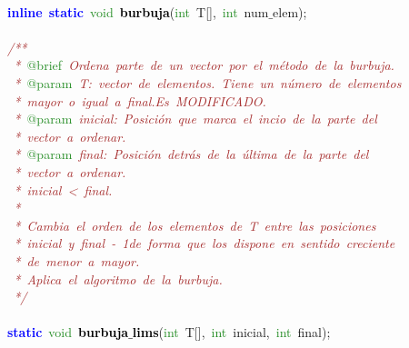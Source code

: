 \mbox{} \\
\mbox{}\textbf{\textcolor{Blue}{inline}}\ \textbf{\textcolor{Blue}{static}}\ \textcolor{ForestGreen}{void}\ \textbf{\textcolor{Black}{burbuja}}\textcolor{BrickRed}{(}\textcolor{ForestGreen}{int}\ T\textcolor{BrickRed}{[],}\ \textcolor{ForestGreen}{int}\ num$\_$elem\textcolor{BrickRed}{);} \\
\mbox{} \\
\mbox{}\textit{\textcolor{Brown}{/**}} \\
\mbox{}\textit{\textcolor{Brown}{\ *\ }}\textcolor{ForestGreen}{@brief}\textit{\textcolor{Brown}{\ Ordena\ parte\ de\ un\ vector\ por\ el\ método\ de\ la\ burbuja.}} \\
\mbox{}\textit{\textcolor{Brown}{\ *\ }}\textcolor{ForestGreen}{@param}\textit{\textcolor{Brown}{\ T:\ vector\ de\ elementos.\ Tiene\ un\ número\ de\ elementos}} \\
\mbox{}\textit{\textcolor{Brown}{\ *\ mayor\ o\ igual\ a\ final.Es\ MODIFICADO.}} \\
\mbox{}\textit{\textcolor{Brown}{\ *\ }}\textcolor{ForestGreen}{@param}\textit{\textcolor{Brown}{\ inicial:\ Posición\ que\ marca\ el\ incio\ de\ la\ parte\ del}} \\
\mbox{}\textit{\textcolor{Brown}{\ *\ vector\ a\ ordenar.}} \\
\mbox{}\textit{\textcolor{Brown}{\ *\ }}\textcolor{ForestGreen}{@param}\textit{\textcolor{Brown}{\ final:\ Posición\ detrás\ de\ la\ última\ de\ la\ parte\ del}} \\
\mbox{}\textit{\textcolor{Brown}{\ *\ vector\ a\ ordenar.}} \\
\mbox{}\textit{\textcolor{Brown}{\ *\ inicial\ \textless{}\ final.}} \\
\mbox{}\textit{\textcolor{Brown}{\ *\ }} \\
\mbox{}\textit{\textcolor{Brown}{\ *\ Cambia\ el\ orden\ de\ los\ elementos\ de\ T\ entre\ las\ posiciones}} \\
\mbox{}\textit{\textcolor{Brown}{\ *\ inicial\ y\ final\ -\ 1de\ forma\ que\ los\ dispone\ en\ sentido\ creciente}} \\
\mbox{}\textit{\textcolor{Brown}{\ *\ de\ menor\ a\ mayor.}} \\
\mbox{}\textit{\textcolor{Brown}{\ *\ Aplica\ el\ algoritmo\ de\ la\ burbuja.}} \\
\mbox{}\textit{\textcolor{Brown}{\ */}} \\
\mbox{} \\
\mbox{}\textbf{\textcolor{Blue}{static}}\ \textcolor{ForestGreen}{void}\ \textbf{\textcolor{Black}{burbuja$\_$lims}}\textcolor{BrickRed}{(}\textcolor{ForestGreen}{int}\ T\textcolor{BrickRed}{[],}\ \textcolor{ForestGreen}{int}\ inicial\textcolor{BrickRed}{,}\ \textcolor{ForestGreen}{int}\ final\textcolor{BrickRed}{);} \\
